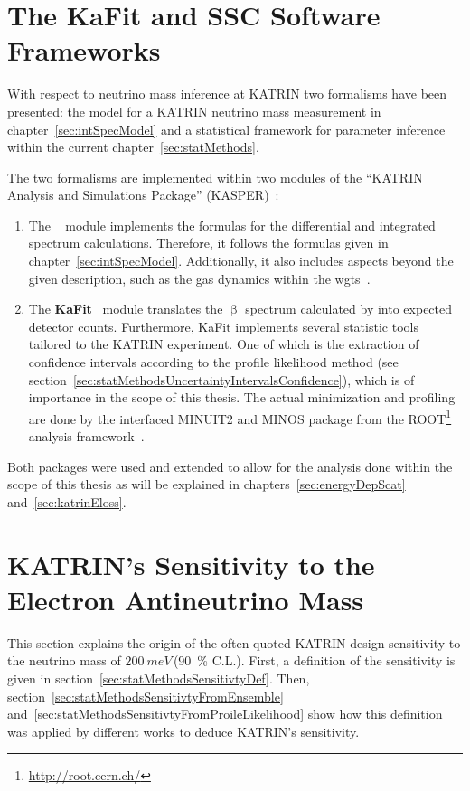 \section{The KaFit and SSC Software Frameworks}
\label{sec:statMethodsKaFitSSC}
With respect to neutrino mass inference at KATRIN two formalisms have been presented: the model for a KATRIN neutrino mass measurement in chapter~\ref{sec:intSpecModel} and a statistical framework for parameter inference within the current chapter~\ref{sec:statMethods}.

The two formalisms are implemented within two modules of the ``KATRIN Analysis and Simulations Package'' (KASPER)~\cite{Kasper}:\mynobreakpar
\begin{enumerate}
	\item The \textbf{}~\cite{SSC} module implements the formulas for the differential and integrated spectrum calculations. Therefore, it follows the formulas given in chapter~\ref{sec:intSpecModel}. Additionally, it also includes aspects beyond the given description, such as the gas dynamics within the \gls{wgts}~\cite{Hoetzel2012, Groh2015, Kleesiek2019, Kaefer2012}.
	\item The \textbf{KaFit}~\cite{KaFit} module translates the $\upbeta$ spectrum calculated by  into expected detector counts. Furthermore, KaFit implements several statistic tools tailored to the KATRIN experiment. One of which is the extraction of confidence intervals according to the profile likelihood method (see section~\ref{sec:statMethodsUncertaintyIntervalsConfidence}), which is of importance in the scope of this thesis. The actual minimization and profiling are done by the interfaced MINUIT2 and MINOS package from the ROOT\footnote{\url{http://root.cern.ch/}}~\cite{ANTCHEVA2009} analysis framework~\cite{Kleesiek2014}.
\end{enumerate}

Both packages were used and extended to allow for the analysis done within the scope of this thesis as will be explained in chapters~\ref{sec:energyDepScat} and~\ref{sec:katrinEloss}.

\section{KATRIN's Sensitivity to the Electron Antineutrino Mass}
\label{sec:statMethodsKatrinSensitivity}
This section explains the origin of the often quoted KATRIN design sensitivity to the neutrino mass of $\SI{200}{meV}$\,(\SI{90}{\percent} C.L.). First, a definition of the sensitivity is given in section~\ref{sec:statMethodsSensitivtyDef}. Then, section~\ref{sec:statMethodsSensitivtyFromEnsemble} and~\ref{sec:statMethodsSensitivtyFromProileLikelihood} show how this definition was applied by different works to deduce KATRIN's sensitivity.


